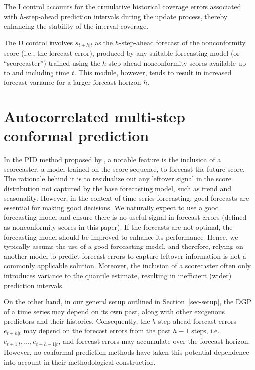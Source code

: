 \documentclass[
  11pt,
  a4paper,
]{article}
\theoremstyle{plain}
\theoremstyle{remark}
\begin{document}
The I control accounts for the cumulative historical coverage errors
associated with \(h\)-step-ahead prediction intervals during the update
process, thereby enhancing the stability of the interval coverage.

The D control involves \(\hat{s}_{t+h|t}\) as the \(h\)-step-ahead
forecast of the nonconformity score (i.e., the forecast error), produced
by any suitable forecasting model (or ``scorecaster'') trained using the
\(h\)-step-ahead nonconformity scores available up to and including time
\(t\). This module, however, tends to result in increased forecast
variance for a larger forecast horizon
\(h\).

\section{Autocorrelated multi-step conformal
prediction}\label{sec-acmcp}

In the PID method proposed by \textcite{angelopoulos2024}, a notable
feature is the inclusion of a scorecaster, a model trained on the score
sequence, to forecast the future score. The rationale behind it is to
residualize out any leftover signal in the score distribution not
captured by the base forecasting model, such as trend and seasonality.
However, in the context of time series forecasting, good forecasts are
essential for making good decisions. We naturally expect to use a good
forecasting model and ensure there is no useful signal in forecast
errors (defined as nonconformity scores in this paper). If the forecasts
are not optimal, the forecasting model should be improved to enhance its
performance. Hence, we typically assume the use of a good forecasting
model, and therefore, relying on another model to predict forecast
errors to capture leftover information is not a commonly applicable
solution. Moreover, the inclusion of a scorecaster often only introduces
variance to the quantile estimate, resulting in inefficient (wider)
prediction intervals.

On the other hand, in our general setup outlined in
Section~\ref{sec-setup}, the DGP of a time series may depend on its own
past, along with other exogenous predictors and their histories.
Consequently, the \(h\)-step-ahead forecast errors \(e_{t+h|t}\) may
depend on the forecast errors from the past \(h-1\) steps,
i.e.~\(e_{t+1|t}, \ldots, e_{t+h-1|t}\), and forecast errors may
accumulate over the forecast horizon. However, no conformal prediction
methods have taken this potential dependence into account in their
methodological construction.
\end{document}
